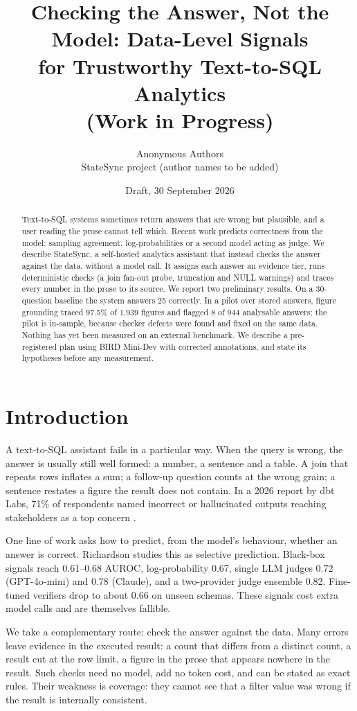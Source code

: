 \documentclass[10pt,twocolumn]{article}
\title{Checking the Answer, Not the Model: Data-Level Signals\\ for Trustworthy Text-to-SQL Analytics\\[2pt]\large (Work in Progress)}
\author{Anonymous Authors\\ \small StateSync project (author names to be added)}
\date{Draft, 30 September 2026}
\begin{document}
\maketitle

\begin{abstract}
Text-to-SQL systems sometimes return answers that are wrong but plausible, and a user reading the prose cannot tell which. Recent work predicts correctness from the model: sampling agreement, log-probabilities or a second model acting as judge. We describe StateSync, a self-hosted analytics assistant that instead checks the answer against the data, without a model call. It assigns each answer an evidence tier, runs deterministic checks (a join fan-out probe, truncation and NULL warnings) and traces every number in the prose to its source. We report two preliminary results. On a 30-question baseline the system answers 25 correctly. In a pilot over stored answers, figure grounding traced 97.5\% of 1,939 figures and flagged 8 of 944 analysable answers; the pilot is in-sample, because checker defects were found and fixed on the same data. Nothing has yet been measured on an external benchmark. We describe a pre-registered plan using BIRD Mini-Dev with corrected annotations, and state its hypotheses before any measurement.
\end{abstract}

\section{Introduction}
A text-to-SQL assistant fails in a particular way. When the query is wrong, the answer is usually still well formed: a number, a sentence and a table. A join that repeats rows inflates a sum; a follow-up question counts at the wrong grain; a sentence restates a figure the result does not contain. In a 2026 report by dbt Labs, 71\% of respondents named incorrect or hallucinated outputs reaching stakeholders as a top concern \cite{dbt2026report}.

One line of work asks how to predict, from the model's behaviour, whether an answer is correct. Richardson \cite{richardson2026} studies this as selective prediction. Black-box signals reach 0.61--0.68 AUROC, log-probability 0.67, single LLM judges 0.72 (GPT-4o-mini) and 0.78 (Claude), and a two-provider judge ensemble 0.82. Fine-tuned verifiers drop to about 0.66 on unseen schemas. These signals cost extra model calls and are themselves fallible.

We take a complementary route: check the answer against the data. Many errors leave evidence in the executed result: a count that differs from a distinct count, a result cut at the row limit, a figure in the prose that appears nowhere in the result. Such checks need no model, add no token cost, and can be stated as exact rules. Their weakness is coverage: they cannot see that a filter value was wrong if the result is internally consistent.
\end{document}
